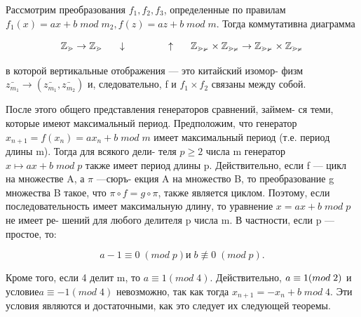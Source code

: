 \begin{myproof}
Рассмотрим преобразования $f_{1}, f_{2}, f_{3}$, определенные по правилам \linebreak \indent $f_{1}(x) = ax + b \; mod \; m_{2}, f(z) = az + b \; mod \; m.$ \linebreak \indent Тогда коммутативна диаграмма \par 

$$\mathbb{Z_{m}} \to \mathbb{Z_{m}} \linebreak \indent
 \downarrow \;\;\;\;\;\;\;\;\;\;\;\;\;\;\;\; \uparrow \linebreak \indent
 \mathbb{Z_{m_{1}}} \times \mathbb{Z_{m_{2}}} \to \mathbb{Z_{m_{1}}} \times \mathbb{Z_{m_{2}}}$$ \par 
 в которой вертикальные отображения --- это китайский изомор- \linebreak \indent физм $\bar{z_{m_{1}}} \to (\bar{z_{m_{1}}}, \bar{z_{m_{2}}})$ и, следовательно, f и $f_{1} \times f_{2}$ связаны между \linebreak \indent собой. \end{myproof}
 \newpage
 
 
После этого общего представления генераторов сравнений, займем-  \linebreak ся теми, которые имеют максимальный период. \linebreak 
\indent Предположим, что генератор $x_{n+1} = f(x_{n}) = ax_{n} + b \; mod \; m$ имеет \linebreak максимальный период (т.е. период длины m). Тогда для всякого дели- \linebreak теля $p \geqslant 2$ числа m генератор $x \mapsto ax + b \; mod \; p$ также имеет период \linebreak длины p. Действительно, если f --- цикл на множестве A, а $\pi$ ---сюръ- \linebreak екция A на множество B, то преобразование g множества B такое, что \linebreak $\pi \circ f = g \circ \pi$, также является циклом. Поэтому, если последовательность \linebreak имеет максимальную длину, то уравнение $x = ax + b \; mod \; p$ не имеет ре- \linebreak шений для любого делителя p числа m. В частности, если p --- простое, \linebreak то: \par
$$a - 1 \equiv 0 \; (mod \; p) и\; b \not\equiv 0 \; (mod \; p).$$ \par 
\noindent Кроме того, если 4 делит m, то $a \equiv 1 (mod \; 4)$. Действительно, $a \equiv 1 \linebreak (mod \; 2)$  и условие$ a \equiv -1 (mod \; 4)$ невозможно, так как тогда \linebreak $x_{n+1} = -x_{n} + b \; mod \; 4$. Эти условия являются и \linebreak достаточными, как это следует их следующей теоремы. \par 

